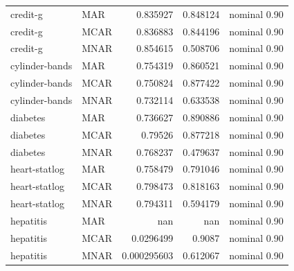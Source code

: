 \begin{table}[ht]
\begin{tabular}{llrrl}
 credit-g             & MAR         &                    0.835927    &                         0.848124 & nominal 0.90              \\
 credit-g             & MCAR        &                    0.836883    &                         0.844196 & nominal 0.90              \\
 credit-g             & MNAR        &                    0.854615    &                         0.508706 & nominal 0.90              \\
 cylinder-bands       & MAR         &                    0.754319    &                         0.860521 & nominal 0.90              \\
 cylinder-bands       & MCAR        &                    0.750824    &                         0.877422 & nominal 0.90              \\
 cylinder-bands       & MNAR        &                    0.732114    &                         0.633538 & nominal 0.90              \\
 diabetes             & MAR         &                    0.736627    &                         0.890886 & nominal 0.90              \\
 diabetes             & MCAR        &                    0.79526     &                         0.877218 & nominal 0.90              \\
 diabetes             & MNAR        &                    0.768237    &                         0.479637 & nominal 0.90              \\
 heart-statlog        & MAR         &                    0.758479    &                         0.791046 & nominal 0.90              \\
 heart-statlog        & MCAR        &                    0.798473    &                         0.818163 & nominal 0.90              \\
 heart-statlog        & MNAR        &                    0.794311    &                         0.594179 & nominal 0.90              \\
 hepatitis            & MAR         &                  nan           &                       nan        & nominal 0.90              \\
 hepatitis            & MCAR        &                    0.0296499   &                         0.9087   & nominal 0.90              \\
 hepatitis            & MNAR        &                    0.000295603 &                         0.612067 & nominal 0.90              \\

\end{tabular}
\end{table}
